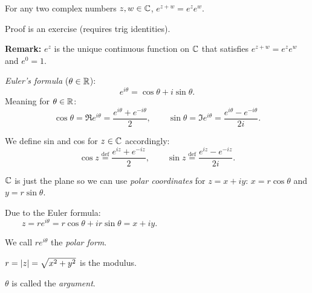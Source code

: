 \documentclass[10pt,aspectratio=169]{beamer}
\begin{document}
\begin{frame}
\begin{proposition}
For any two complex numbers $z,w \in {\mathbb{C}}$,
$
e^{z+w} = e^z e^w .
$
\end{proposition}

Proof is an exercise (requires trig identities).

\medskip
\pause
\textbf{Remark:}  $e^z$ is the unique continuous
function on ${\mathbb{C}}$ that satisfies $e^{z+w} = e^z e^w$ and $e^0 = 1$.

\pause
\medskip

\emph{Euler's formula} ($\theta \in {\mathbb{R}}$):
\begin{equation*}
e^{i\theta}
=
\cos \theta + i \sin \theta .
\end{equation*}
\pause
Meaning for $\theta \in {\mathbb{R}}$:
\begin{equation*}
\cos \theta = \Re e^{i\theta} = \frac{e^{i\theta}+e^{-i\theta}}{2} ,
\qquad
\sin \theta = \Im e^{i\theta} = \frac{e^{i\theta}-e^{-i\theta}}{2i} .
\end{equation*}

\pause
We define sin and cos for $z \in {\mathbb{C}}$ accordingly:
\begin{equation*}
\cos z \overset{\text{def}}{=} \frac{e^{iz}+e^{-iz}}{2} ,
\qquad
\sin z \overset{\text{def}}{=} \frac{e^{iz}-e^{-iz}}{2i} .
\end{equation*}

\end{frame}

\begin{frame}
${\mathbb{C}}$ is just the plane so we can use \emph{polar coordinates} for $z=x+iy$:
$x = r \cos \theta$ and $y= r \sin \theta$.

\medskip
\pause
Due to the Euler formula:
\begin{equation*}
z = r e^{i\theta} = r\cos \theta + i r\sin \theta  = x+iy .
\qquad \qquad \qquad \qquad \qquad \qquad \qquad \qquad
\end{equation*}

\vspace*{-0.5in}
\hspace*{3.5in}{polarcoords.pdf_t}

\vspace*{-0.4in}

\pause

We call $re^{i \theta}$ the \emph{polar form}.

\pause
\medskip


$r = \lvert {z} \rvert = \sqrt{x^2+y^2}$ is the modulus.

\pause
\medskip

$\theta$ is called the \emph{argument}.

\end{frame}
\end{document}
